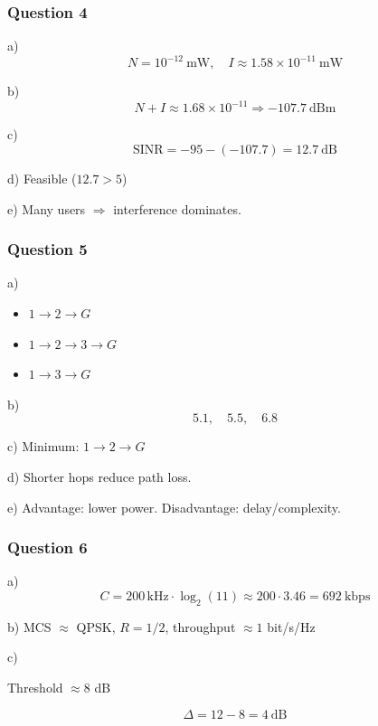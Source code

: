 \vspace{0.3cm}

\subsubsection*{Question 4}

a)
\[
N = 10^{-12}\ \mathrm{mW}, \quad I \approx 1.58\times 10^{-11}\ \mathrm{mW}
\]

b)
\[
N+I \approx 1.68\times10^{-11} \Rightarrow -107.7\ \mathrm{dBm}
\]

c)
\[
\mathrm{SINR} = -95 - (-107.7) = 12.7\ \mathrm{dB}
\]

d) Feasible ($12.7 > 5$)

e) Many users $\Rightarrow$ interference dominates.

\vspace{0.3cm}

\subsubsection*{Question 5}

a)
\begin{itemize}
\item $1 \rightarrow 2 \rightarrow G$
\item $1 \rightarrow 2 \rightarrow 3 \rightarrow G$
\item $1 \rightarrow 3 \rightarrow G$
\end{itemize}

b)
\[
5.1,\quad 5.5,\quad 6.8
\]

c) Minimum: $1 \rightarrow 2 \rightarrow G$

d) Shorter hops reduce path loss.

e) Advantage: lower power. Disadvantage: delay/complexity.

\vspace{0.3cm}

\subsubsection*{Question 6}

a)
\[
C = 200\,\mathrm{kHz} \cdot \log_2(11) \approx 200 \cdot 3.46 = 692\ \mathrm{kbps}
\]

b)
MCS $\approx$ QPSK, $R=1/2$, throughput $\approx 1$ bit/s/Hz

c)

Threshold $\approx 8$ dB

\[
\Delta = 12 - 8 = 4\ \mathrm{dB}
\]


